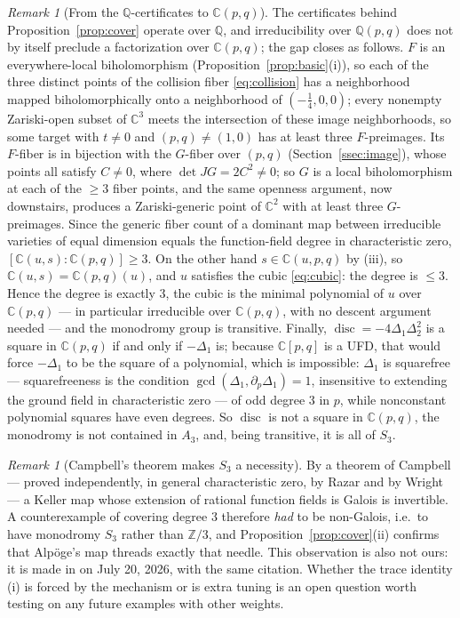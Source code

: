 \documentclass[11pt]{amsart}
\newcommand{\CC}{\mathbb{C}}
\newcommand{\QQ}{\mathbb{Q}}
\newcommand{\disc}{\operatorname{disc}}
\theoremstyle{plain}
\theoremstyle{definition}
\theoremstyle{remark}
\newtheorem{remark}[theorem]{Remark}
\begin{document}
\begin{remark}[From the $\QQ$-certificates to $\CC(p,q)$]
\label{rem:groundfield}
The certificates behind Proposition~\ref{prop:cover} operate over $\QQ$,
and irreducibility over $\QQ(p,q)$ does not by itself preclude a
factorization over $\CC(p,q)$; the gap closes as follows. $F$ is an
everywhere-local biholomorphism (Proposition~\ref{prop:basic}(i)), so each
of the three distinct points of the collision fiber \eqref{eq:collision}
has a neighborhood mapped biholomorphically onto a neighborhood of
$(-\tfrac14,0,0)$; every nonempty Zariski-open subset of $\CC^{3}$ meets
the intersection of these image neighborhoods, so some target with
$t\neq0$ and $(p,q)\neq(1,0)$ has at least three $F$-preimages. Its
$F$-fiber is in bijection with the $G$-fiber over $(p,q)$
(Section~\ref{ssec:image}), whose points all satisfy $C\neq0$, where
$\det JG=2C^{2}\neq0$; so $G$ is a local biholomorphism at each of the
$\ge3$ fiber points, and the same openness argument, now downstairs,
produces a Zariski-generic point of $\CC^{2}$ with at least three
$G$-preimages. Since the generic fiber count of a dominant map between
irreducible varieties of equal dimension equals the function-field degree
in characteristic zero, $[\CC(u,s):\CC(p,q)]\ge3$. On the other hand
$s\in\CC(u,p,q)$ by (iii), so $\CC(u,s)=\CC(p,q)(u)$, and $u$ satisfies
the cubic \eqref{eq:cubic}: the degree is $\le3$. Hence the degree is
exactly $3$, the cubic is the minimal polynomial of $u$ over $\CC(p,q)$
--- in particular irreducible over $\CC(p,q)$, with no descent argument
needed --- and the monodromy group is transitive. Finally,
$\disc=-4\Delta_{1}\Delta_{2}^{2}$ is a square in $\CC(p,q)$ if and only
if $-\Delta_{1}$ is; because $\CC[p,q]$ is a UFD, that would force
$-\Delta_{1}$ to be the square of a polynomial, which is impossible:
$\Delta_{1}$ is squarefree --- squarefreeness is the condition
$\gcd(\Delta_{1},\partial_{p}\Delta_{1})=1$, insensitive to extending the
ground field in characteristic zero --- of odd degree $3$ in $p$, while
nonconstant polynomial squares have even degrees. So $\disc$ is not a
square in $\CC(p,q)$, the monodromy is not contained in $A_{3}$, and,
being transitive, it is all of $S_{3}$.
\end{remark}

\begin{remark}[Campbell's theorem makes $S_{3}$ a necessity]
By a theorem of Campbell \cite{Campbell73} --- proved independently, in
general characteristic zero, by Razar and by Wright --- a Keller map whose
extension of rational function fields is Galois is invertible. A
counterexample of covering degree $3$ therefore \emph{had} to be
non-Galois, i.e.\ to have monodromy $S_{3}$ rather than $\mathbb{Z}/3$,
and Proposition~\ref{prop:cover}(ii) confirms that Alp\"oge's map threads
exactly that needle. This observation is also not ours: it is made in
\cite{MO513387} on July 20, 2026, with the same citation. Whether the
trace identity (i) is forced by the mechanism or is extra tuning is an
open question worth testing on any future examples with other weights.
\end{remark}
\end{document}
